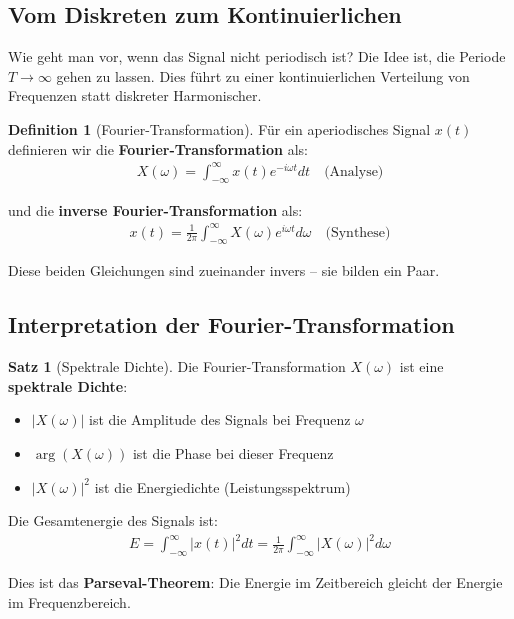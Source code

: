 ﻿\documentclass[a4paper,12pt]{report}
\theoremstyle{definition}
\newtheorem{definition}{Definition}
\newtheorem{satz}{Satz}
\begin{document}
	\subsection{Vom Diskreten zum Kontinuierlichen}
	
	Wie geht man vor, wenn das Signal nicht periodisch ist? Die Idee ist, die Periode $T \to \infty$ gehen zu lassen. Dies führt zu einer kontinuierlichen Verteilung von Frequenzen statt diskreter Harmonischer.
	
	\begin{definition}[Fourier-Transformation]
		Für ein aperiodisches Signal $x(t)$ definieren wir die \textbf{Fourier-Transformation} als:
		\begin{align}
			X(\omega) = \int_{-\infty}^{\infty} x(t) e^{-i\omega t} dt \quad \text{(Analyse)}
		\end{align}
		
		und die \textbf{inverse Fourier-Transformation} als:
		\begin{align}
			x(t) = \frac{1}{2\pi} \int_{-\infty}^{\infty} X(\omega) e^{i\omega t} d\omega \quad \text{(Synthese)}
		\end{align}
		
		Diese beiden Gleichungen sind zueinander invers -- sie bilden ein Paar.
	\end{definition}
	
	\subsection{Interpretation der Fourier-Transformation}
	
	\begin{satz}[Spektrale Dichte]
		Die Fourier-Transformation $X(\omega)$ ist eine \textbf{spektrale Dichte}:
		\begin{itemize}
			\item[-] $|X(\omega)|$ ist die Amplitude des Signals bei Frequenz $\omega$
			\item[-] $\arg(X(\omega))$ ist die Phase bei dieser Frequenz
			\item[-] $|X(\omega)|^2$ ist die Energiedichte (Leistungsspektrum)
		\end{itemize}
		
		Die Gesamtenergie des Signals ist:
		\begin{align}
			E = \int_{-\infty}^{\infty} |x(t)|^2 dt = \frac{1}{2\pi} \int_{-\infty}^{\infty} |X(\omega)|^2 d\omega
		\end{align}
		
		Dies ist das \textbf{Parseval-Theorem}: Die Energie im Zeitbereich gleicht der Energie im Frequenzbereich.
	\end{satz}
	
\end{document}
